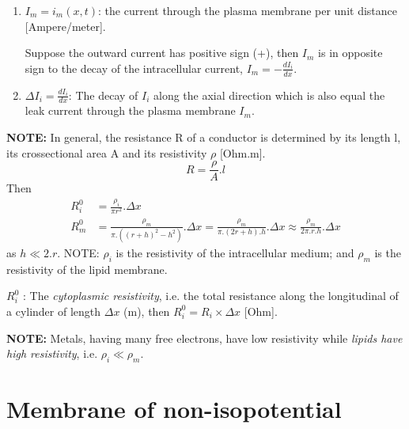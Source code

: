 \begin{enumerate}
  \item $I_m = i_m(x,t)$: the current through the plasma membrane per unit
  distance [Ampere/meter].
  
  Suppose the outward current has positive sign (+), then $I_m$ is in opposite
  sign to the decay of the intracellular current, $I_m = -\frac{dI_i}{dx}$.
    
  \item $\Delta I_i = \frac{dI_i}{dx}$: The decay of $I_i$ along the axial
  direction which is also equal the leak current through the plasma membrane
  $I_m$. 
  

 
\end{enumerate}

\begin{mdframed}

{\bf NOTE:} In general, the resistance R of a conductor is determined
by its length l, its crossectional area A and its resistivity $\rho$
[Ohm.m].
\begin{equation}
  R = \frac{\rho}{A}.l
\end{equation}
Then
\begin{equation}
  \label{eq:resistance}
  \begin{split}
R_i^0 &= \frac{\rho_i}{\pi r^2}.\Delta x \\
R_m^0 &= \frac{\rho_m}{\pi.((r+h)^2-h^2)}.\Delta x 
= \frac{\rho_m}{\pi.(2r+h).h}.\Delta x
\approx \frac{\rho_m}{2\pi.r.h}.\Delta x
\end{split}
\end{equation}
as $h \ll 2.r$. NOTE: $\rho_i$ is the resistivity of the intracellular medium;
and $\rho_m$ is the resistivity of the lipid membrane.

$R_i^0$ : The  {\it cytoplasmic resistivity}, i.e. the total resistance along
the longitudinal of a cylinder of length $\Delta x$ (m), then $R_i^0 = R_i\times
\Delta  x$ [Ohm].

{\bf NOTE:} Metals, having many free electrons, have low resistivity while
{\it lipids have high resistivity}, i.e. $\rho_i \ll \rho_m$.
\end{mdframed}



\section{Membrane of non-isopotential}
\label{sec:membrane-RC-circuit-non-isopotential}

